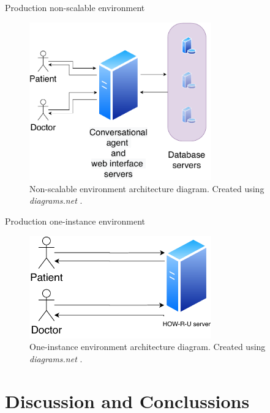 \documentclass{beamer}
\begin{document}
\begin{frame}[fragile]{Production non-scalable environment}
  \begin{figure}[H]
    \centering
    \includegraphics[width=0.7\textwidth]{non-scalable.pdf}
    \caption{Non-scalable environment architecture diagram. Created using \emph{diagrams.net} \protect\cite{drawio}.}
  \end{figure}
\end{frame}

\begin{frame}[fragile]{Production one-instance environment}
  \begin{figure}[H]
    \centering
    \includegraphics[width=0.7\textwidth]{one-instance.pdf}
    \caption{One-instance environment architecture diagram. Created using \emph{diagrams.net} \protect\cite{drawio}.}
  \end{figure}
\end{frame}


\section{Discussion and Conclussions}
\end{document}
